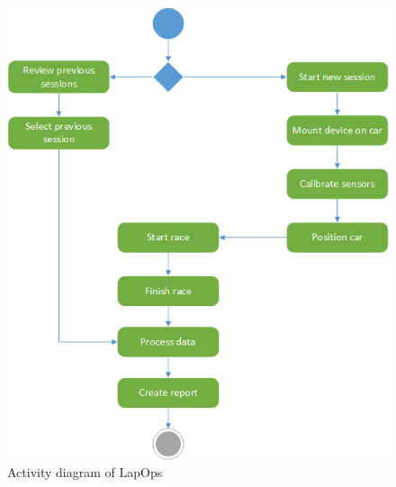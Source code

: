 \begin{figure}[H]
	\centering
	\includegraphics[scale=0.8]{Pictures/activitydiagram.png}
	\caption{Activity diagram of LapOps}
	\label{activitydiagram}
\end{figure}